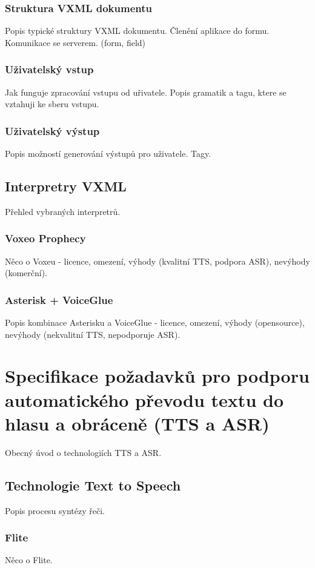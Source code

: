 \documentclass[ing,male,java,dept460]{diploma}						%
\begin{document}
\subsubsection{Struktura VXML dokumentu}
Popis typické struktury VXML dokumentu. Členění aplikace do formu. Komunikace se serverem. (form, field)

\subsubsection{Uživatelský vstup}
Jak funguje zpracování vstupu od uřivatele. Popis gramatik a tagu, ktere se vztahuji ke sberu vstupu.

\subsubsection{Uživatelský výstup}
Popis možností generování výstupů pro uživatele. Tagy.

\subsection{Interpretry VXML}
Přehled vybraných interpretrů.

\subsubsection{Voxeo Prophecy}
Něco o Voxeu - licence, omezení, výhody (kvalitní TTS, podpora ASR), nevýhody (komerční).

\subsubsection{Asterisk + VoiceGlue}
Popis kombinace Asterisku a VoiceGlue - licence, omezení, výhody (opensource), nevýhody (nekvalitní TTS, nepodporuje ASR).

\section{Specifikace požadavků pro podporu automatického převodu textu do hlasu a obráceně (TTS a ASR)}
\label{sec:Podpora_TTS_a_ASR}
Obecný úvod o technologiích TTS a ASR.

\subsection{Technologie Text to Speech}
Popis procesu syntézy řeči.

\subsubsection{Flite}
Něco o Flite.
\end{document}
